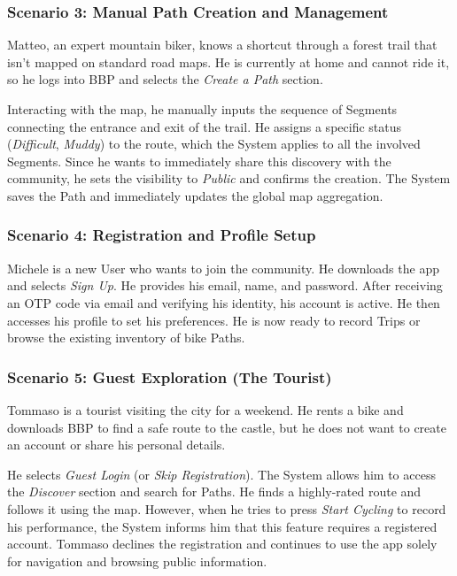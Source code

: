 \subsubsection*{Scenario 3: Manual Path Creation and Management}
Matteo, an expert mountain biker, knows a shortcut through a forest trail that isn't mapped on standard road maps. He is currently at home and cannot ride it, so he logs into BBP and selects the \emph{Create a Path} section. 

Interacting with the map, he manually inputs the sequence of Segments connecting the entrance and exit of the trail. He assigns a specific status (\emph{Difficult}, \emph{Muddy}) to the route, which the System applies to all the involved Segments. Since he wants to immediately share this discovery with the community, he sets the visibility to \emph{Public} and confirms the creation. The System saves the Path and immediately updates the global map aggregation.

\subsubsection*{Scenario 4: Registration and Profile Setup}
Michele is a new User who wants to join the community. He downloads the app and selects \emph{Sign Up}. He provides his email, name, and password. After receiving an OTP code via email and verifying his identity, his account is active. He then accesses his profile to set his preferences. He is now ready to record Trips or browse the existing inventory of bike Paths.

\subsubsection*{Scenario 5: Guest Exploration (The Tourist)}
Tommaso is a tourist visiting the city for a weekend. He rents a bike and downloads BBP to find a safe route to the castle, but he does not want to create an account or share his personal details.

He selects \emph{Guest Login} (or \emph{Skip Registration}). The System allows him to access the \emph{Discover} section and search for Paths. He finds a highly-rated route and follows it using the map. However, when he tries to press \emph{Start Cycling} to record his performance, the System informs him that this feature requires a registered account. Tommaso declines the registration and continues to use the app solely for navigation and browsing public information.

